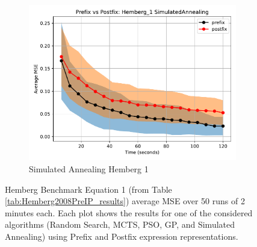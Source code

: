 \documentclass[12pt]{iopart}
\begin{document}
\begin{figure}
    \vspace{0.5cm}
    
    \begin{subfigure}[b]{0.4\textwidth}
        \includegraphics[width=\linewidth, keepaspectratio]{Hemberg_Benchmarks/PrePostHemberg_1SimulatedAnnealing.pdf}
        \caption{Simulated Annealing Hemberg 1}
        \label{subfig:hemberg_1_SA}
    \end{subfigure}
    
    \caption{Hemberg Benchmark Equation 1 (from Table \ref{tab:Hemberg2008PreIP_results}) average MSE over 50 runs of 2 minutes each. Each plot shows the results for one of the considered algorithms (Random Search, MCTS, PSO, GP, and Simulated Annealing) using Prefix and Postfix expression representations.}
    \label{fig:Hemberg_1_Benchmarks}
\end{figure}
\end{document}
